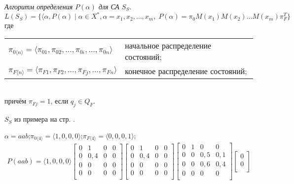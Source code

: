 \emph{Алгоритм определения $P(\alpha)$ для СА $S_S$}.  
$$L(S_S) = \{\langle \alpha, P(\alpha) \mid \alpha \in X^*,
\alpha=x_1,x_2,\ldots,x_m,\;P(\alpha) = \pi_0M(x_1)M(x_2) \ldots
M(x_m)\pi_F^T \}$$
где
\begin{tabular}[t]{l @{\;---\;} l @{}}
  $\pi_{0\langle n \rangle} = \langle \pi_{01}, \pi_{02}, \ldots,
  \pi_{0i}, \ldots, \pi_{0n} \rangle$ & начальное распределение
  состояний;\\
  $\pi_{F\langle n \rangle} = \langle \pi_{F1}, \pi_{F2}, \ldots,
  \pi_{Fj}, \ldots, \pi_{Fn} \rangle$ & конечное распределение
  состояний;\\
\end{tabular}\\
причём $\pi_{Fj} = 1$, если $q_j \in Q_F$.

\begin{ex}
  $S_S$ из примера на стр. \pageref{ex:KA}.
  \begin{list}{)}{}
  \item $\alpha = aab$;\quad $\pi_{0\langle 4 \rangle} = \langle 1, 0,
    0, 0 \rangle$;\quad $\pi_{F\langle 4 \rangle} = \langle 0, 0, 0, 1
    \rangle$;
    \begin{gather*}
      P(aab) = \langle 1,0,0,0 \rangle
      \begin{bmatrix}
        0 & 1 & 0 & 0\\
        0 & 0{,}4 & 0 & 0\\
        0 & 0 & 0 & 0\\
        0 & 0 & 0 & 0\\
      \end{bmatrix}
      \begin{bmatrix}
        0 & 1 & 0 & 0\\
        0 & 0{,}4 & 0 & 0\\
        0 & 0 & 0 & 0\\
        0 & 0 & 0 & 0\\
      \end{bmatrix}
      \begin{bmatrix}
        0 & 1 & 0 & 0\\
        0 & 0 & 0{,}5 & 0{,}1\\
        0 & 0 & 0{,}6 & 0{,}4\\
        0 & 0 & 0 & 0\\
      \end{bmatrix}
      \begin{bmatrix}
        0\\
        0\\

\end{bmatrix}
\end{gather*}
\end{list}
\end{ex}
